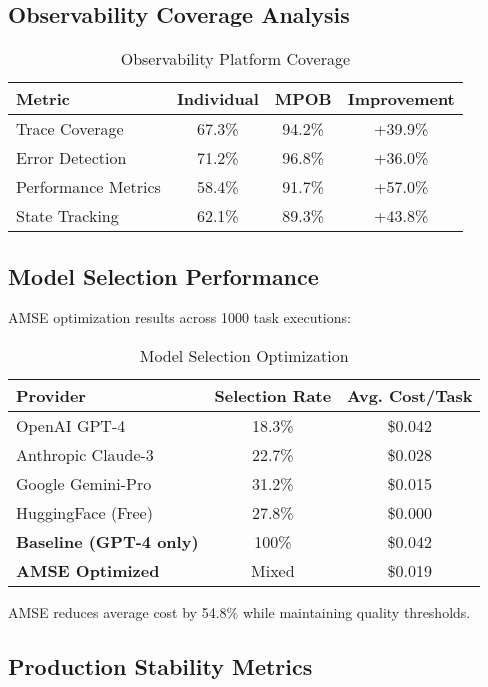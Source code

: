 \documentclass[conference]{IEEEtran}
\begin{document}
\subsection{Observability Coverage Analysis}

\begin{table}[htbp]
\centering
\caption{Observability Platform Coverage}
\label{tab:observability}
\begin{tabular}{@{}lccc@{}}
\toprule
\textbf{Metric} & \textbf{Individual} & \textbf{MPOB} & \textbf{Improvement} \\
\midrule
Trace Coverage & 67.3\% & 94.2\% & +39.9\% \\
Error Detection & 71.2\% & 96.8\% & +36.0\% \\
Performance Metrics & 58.4\% & 91.7\% & +57.0\% \\
State Tracking & 62.1\% & 89.3\% & +43.8\% \\
\bottomrule
\end{tabular}
\end{table}

\subsection{Model Selection Performance}

AMSE optimization results across 1000 task executions:

\begin{table}[htbp]
\centering
\caption{Model Selection Optimization}
\label{tab:model_selection}
\begin{tabular}{@{}lcc@{}}
\toprule
\textbf{Provider} & \textbf{Selection Rate} & \textbf{Avg. Cost/Task} \\
\midrule
OpenAI GPT-4 & 18.3\% & \$0.042 \\
Anthropic Claude-3 & 22.7\% & \$0.028 \\
Google Gemini-Pro & 31.2\% & \$0.015 \\
HuggingFace (Free) & 27.8\% & \$0.000 \\
\midrule
\textbf{Baseline (GPT-4 only)} & 100\% & \$0.042 \\
\textbf{AMSE Optimized} & Mixed & \$0.019 \\
\bottomrule
\end{tabular}
\end{table}

AMSE reduces average cost by 54.8\% while maintaining quality thresholds.

\subsection{Production Stability Metrics}
\end{document}
